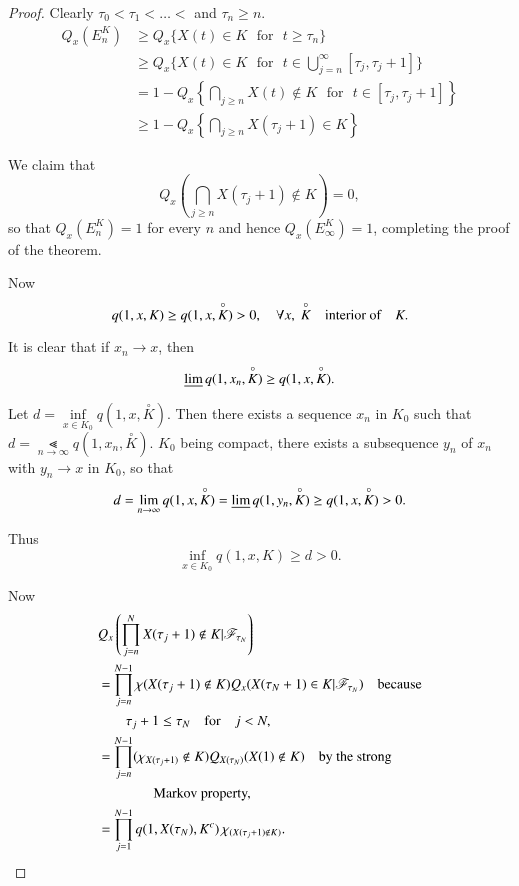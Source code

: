 \begin{proof}
Clearly $\tau_{0}<\tau_{1}<\ldots<$ and $\tau_{n}\geq n$.
\begin{align*}
Q_{x}(E^{K}_{n}) &\geq Q_{x}\{X(t)\in K\text{~ for~ } t\geq
\tau_{n}\}\\
&\geq Q_{x}\{X(t)\in K\text{~ for~ } t\in
\bigcup\limits^{\infty}_{j=n}[\tau_{j},\tau_{j}+1]\}\\ 
&= 1-Q_{x}\left\{\bigcap\limits_{j\geq n}X(t)\not\in K\text{~ for~ } t\in
              [\tau_{j},\tau_{j}+1]\right\}\\
&\geq 1-Q_{x}\left\{\bigcap\limits_{j\geq n}X(\tau_{j}+1)\in K\right\}
\end{align*}\pageoriginale

We claim that
$$
Q_{x}(\bigcap\limits_{j\geq n}X(\tau_{j}+1)\not\in K)=0,
$$
so that $Q_{x}(E^{K}_{n})=1$ for every $n$ and hence
$Q_{x}(E^{K}_{\infty})=1$, completing the proof of the theorem.

Now 
$$
q(1,x,K)\geq q(1,x,\overset{\circ}{K})>0,\quad \forall
x,\ \overset{\circ}{K}\quad\text{interior of}\quad K.
$$

It is clear that if $x_{n}\to x$, then
$$
\varliminf q(1,x_{n},\overset{\circ}{K})\geq
q(1,x,\overset{\circ}{K}).
$$

Let $d=\inf\limits_{x\in K_{0}}q(1,x,\overset{\circ}{K})$. Then there
exists a sequence $x_{n}$ in $K_{0}$ such that $d=\Lt\limits_{n\to
  \infty}q(1,x_{n},\overset{\circ}{K})$. $K_{0}$ being compact, there
exists a subsequence $y_{n}$ of $x_{n}$ with $y_{n}\to x$ in $K_{0}$,
so that
$$
d=\lim\limits_{n\to \infty}q(1,x,\overset{\circ}{K})=\varliminf
q(1,y_{n},\overset{\circ}{K})\geq q(1,x,\overset{\circ}{K})>0.
$$

Thus
$$
\inf\limits_{x\in K_{0}}q(1,x,K)\geq d>0.
$$

Now 
\begin{align*}
& Q_{x}\left(\prod^{N}_{j=n}X(\tau_{j}+1)\not\in
K|\mathscr{F}_{\tau_{N}}\right)\\
&= \prod^{N-1}_{j=n}\chi(X(\tau_{j}+1)\not\in K)Q_{x}(X(\tau_{N}+1)\in
K|\mathscr{F}_{\tau_{N}})\quad\text{because}\\
&\qquad \tau_{j}+1\leq \tau_{N}\quad\text{for}\quad j<N,\\
&= \prod^{N-1}_{j=n}(\chi_{X(\tau_{j}+1)}\not\in
K)Q_{X(\tau_{N})}(X(1)\not\in K)\quad\text{by the strong}\\
&\qquad\qquad\text{Markov property,}\\
&= \prod^{N-1}_{j=1}q(1,X(\tau_{N}),K^{c})\,\chi_{(X(\tau_{j}+1)\not\in
  K)}.  
\end{align*}\pageoriginale


\end{proof}
